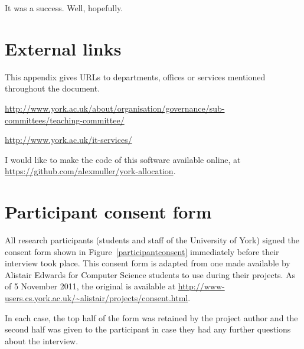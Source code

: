 \documentclass[]{scrartcl}
\begin{document}
It was a success. Well, hopefully.

\appendix


\newpage
\section{External links}

This appendix gives URLs to departments, offices or services mentioned throughout the document.

\url{http://www.york.ac.uk/about/organisation/governance/sub-committees/teaching-committee/}

\url{http://www.york.ac.uk/it-services/}

I would like to make the code of this software available online, at \url{https://github.com/alexmuller/york-allocation}.

\newpage
\section{Participant consent form}
\label{sec:consent}

All research participants (students and staff of the University of York)
signed the consent form shown in Figure~\ref{participantconsent} immediately
before their interview took place. This consent form is adapted from one made
available by Alistair Edwards for Computer Science students to use during
their projects. As of 5 November 2011, the original is available at
\url{http://www-users.cs.york.ac.uk/~alistair/projects/consent.html}.

In each case, the top half of the form was retained by the project author and
the second half was given to the participant in case they had any further
questions about the interview.
\end{document}
